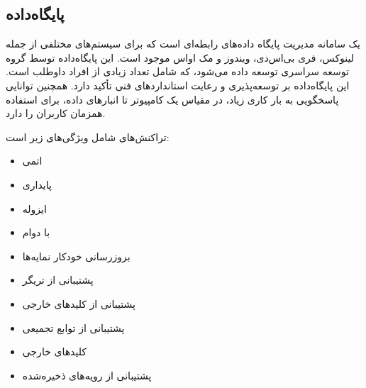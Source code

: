 {\begin{itemize}
\end{itemize}


 
\subsection{پایگاه‌داده }
 یک سامانه مدیریت پایگاه داده‌های رابطه‌ای است که برای سیستم‌های مختلفی از جمله لینوکس، فری بی‌اس‌دی، ویندوز و مک اواس موجود است. این پایگاه‌داده توسط گروه توسعه سراسری  توسعه داده می‌شود، که شامل تعداد زیادی از افراد داوطلب است. این پایگاه‌داده بر توسعه‌پذیری و رعایت استانداردهای فنی تأکید دارد. همچنین توانایی پاسخگویی به بار کاری زیاد، در مقیاس یک کامپیوتر تا انبارهای داده، برای استفاده همزمان کاربران را دارد.
 
تراکنش‌های  شامل ویژگی‌های زیر است:
\begin{itemize}
  	\item اتمی
	\item پایداری
	\item ایزوله
	\item با دوام
	\item بروزرسانی خودکار نمایه‌ها
	\item پشتیبانی از تریگر
	\item پشتیبانی از کلید‌های خارجی
	\item پشتیبانی از توابع تجمیعی
	\item کلید‌های خارجی
	\item پشتیبانی از رویه‌های ذخیره‌شده
\end{itemize}


}
